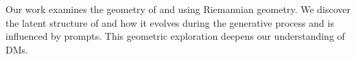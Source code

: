 
{
Our work examines the geometry of \exspace{} and \ehspace{} using Riemannian geometry. We discover the latent structure of \exspace{} and how it evolves during the generative process and is influenced by prompts. This geometric exploration deepens our understanding of DMs.
}

